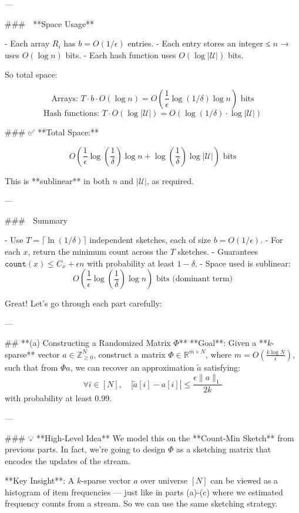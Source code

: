 \begin{enumerate}
\begin{shaded}
---

### 💾 **Space Usage**

- Each array \( R_i \) has \( b = O(1/\epsilon) \) entries.
- Each entry stores an integer ≤ \( n \) → uses \( O(\log n) \) bits.
- Each hash function uses \( O(\log |\mathcal{U}|) \) bits.

So total space:

\[
\text{Arrays: } T \cdot b \cdot O(\log n) = O\left(\frac{1}{\epsilon} \log(1/\delta) \log n\right) \text{ bits}
\]
\[
\text{Hash functions: } T \cdot O(\log |\mathcal{U}|) = O(\log(1/\delta) \cdot \log |\mathcal{U}|)
\]

### ✅ **Total Space:**

\[
\boxed{O\left( \frac{1}{\epsilon} \log\left( \frac{1}{\delta} \right) \log n + \log\left( \frac{1}{\delta} \right) \log |\mathcal{U}| \right) \text{ bits}}
\]

This is **sublinear** in both \( n \) and \( |\mathcal{U}| \), as required.

---

### 🧠 Summary

- Use \( T = \lceil \ln(1/\delta) \rceil \) independent sketches, each of size \( b = O(1/\epsilon) \).
- For each \( x \), return the minimum count across the \( T \) sketches.
- Guarantees \( \texttt{count}(x) \le C_x + \epsilon n \) with probability at least \( 1 - \delta \).
- Space used is sublinear:  
  \[
  O\left( \frac{1}{\epsilon} \log\left( \frac{1}{\delta} \right) \log n \right) \text{ bits (dominant term)}
  \]

  Great! Let's go through each part carefully:

  ---
  
  ## **(a) Constructing a Randomized Matrix \(\Phi\)**  
  **Goal**:  
  Given a **\(k\)-sparse** vector \(a \in \mathbb{Z}_{\geq 0}^N\), construct a matrix \(\Phi \in \mathbb{R}^{m \times N}\), where \(m = O\left( \frac{k \log N}{\epsilon} \right)\), such that from \(\Phi a\), we can recover an approximation \(\tilde{a}\) satisfying:
  \[
  \forall i \in [N],\quad |\tilde{a}[i] - a[i]| \leq \frac{\epsilon \|a\|_1}{2k}
  \]
  with probability at least 0.99.
  
  ---
  
  ### 💡 **High-Level Idea**
  We model this on the **Count-Min Sketch** from previous parts. In fact, we're going to design \(\Phi\) as a sketching matrix that encodes the updates of the stream.
  
  **Key Insight**:  
  A \(k\)-sparse vector \(a\) over universe \([N]\) can be viewed as a histogram of item frequencies — just like in parts (a)-(c) where we estimated frequency counts from a stream. So we can use the same sketching strategy.
  

\end{shaded}
\end{enumerate}
